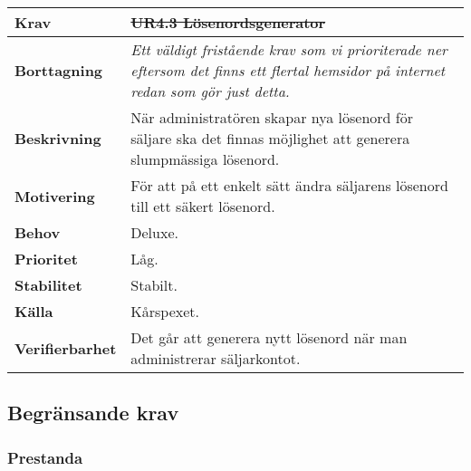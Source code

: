 \documentclass[a4paper, twoside, 11pt, titlepage]{article}
\begin{document}
		\begin {table} [ht] \begin{tabular} { p{2.6cm} p{12.5cm} }
			\hline
			{\sffamily\textbf{Krav}} & {\sffamily\textbf{\sout{UR4.3 Lösenordsgenerator}}} \\
			\hline
			{\sffamily\textbf{Borttagning}} & {\emph{Ett väldigt fristående krav som vi prioriterade ner eftersom det finns ett flertal hemsidor på internet redan som gör just detta.}} \\
			\hline
			{\sffamily\textbf{Beskrivning}} & {När administratören skapar nya lösenord för säljare ska det finnas möjlighet att generera slumpmässiga lösenord.} \\
			\hline
			{\sffamily\textbf{Motivering}} & {För att på ett enkelt sätt ändra säljarens lösenord till ett säkert lösenord.} \\
			\hline
			{\sffamily\textbf{Behov}} & {Deluxe.} \\
			\hline
			{\sffamily\textbf{Prioritet}} & {Låg.} \\
			\hline
			{\sffamily\textbf{Stabilitet}} & {Stabilt.} \\
			\hline
			{\sffamily\textbf{Källa}} & {Kårspexet.} \\
			\hline
			{\sffamily\textbf{Verifierbarhet}} & {Det går att generera nytt lösenord när man administrerar säljarkontot.} \\
			\hline
		\end{tabular} \end{table} \FloatBarrier


	\subsection{Begränsande krav}



		\subsubsection{Prestanda}
\end{document}
